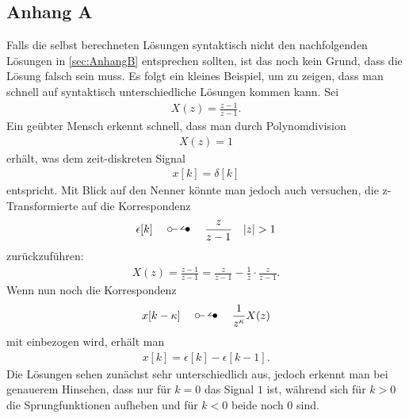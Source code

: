 \subsection{Anhang A}
Falls die selbst berechneten Lösungen syntaktisch nicht den nachfolgenden Lösungen in \ref{sec:AnhangB} entsprechen sollten, ist das noch kein Grund, dass die Lösung falsch sein muss. Es folgt ein kleines Beispiel, um zu zeigen, dass man schnell auf syntaktisch unterschiedliche Lösungen kommen kann.
Sei
\begin{align}
	X(z) = \frac{z-1}{z-1}.
\end{align}
Ein geübter Mensch erkennt schnell, dass man durch Polynomdivision
\begin{align}
	X(z)= 1
\end{align}
erhält, was dem zeit-diskreten Signal
\begin{align}
	x[k] = \delta[k]
\end{align}
entspricht.
Mit Blick auf den Nenner könnte man jedoch auch versuchen, die z-Transformierte auf die Korrespondenz
\begin{align}
	\epsilon[k]\quad\ztransf\quad\frac{z}{z-1}\quad |z| > 1
\end{align}
zurückzuführen:
\begin{align}
	X(z)=\frac{z-1}{z-1}=\frac{z}{z-1}-\frac{1}{z}\cdot\frac{z}{z-1}.
\end{align}
Wenn nun noch die Korrespondenz
\begin{align}
	x[k-\kappa]\quad\ztransf\quad\frac{1}{z^{\kappa}}X(z)
\end{align}
mit einbezogen wird, erhält man
\begin{align}
	x[k]=\epsilon[k]-\epsilon[k-1].
\end{align}
Die Lösungen sehen zunächst sehr unterschiedlich aus, jedoch erkennt man bei genauerem Hinsehen, dass nur für $k=0$ das Signal $1$ ist, während sich für $k>0$ die Sprungfunktionen aufheben und für $k<0$ beide noch $0$ sind.
